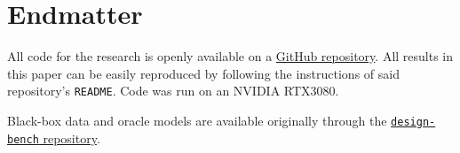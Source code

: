 \chapter{Endmatter} \label{sec:endmatter}



All code for the research is openly available on a
\href{https://github.com/bd3dowling/diffusion-research}{GitHub repository}.
All results in this paper can be easily reproduced by following the instructions of said
repository's \texttt{README}. Code was run on an NVIDIA RTX3080.

Black-box data and oracle models are available originally through the
\href{https://github.com/brandontrabucco/design-bench}{\texttt{design-bench} repository}.
